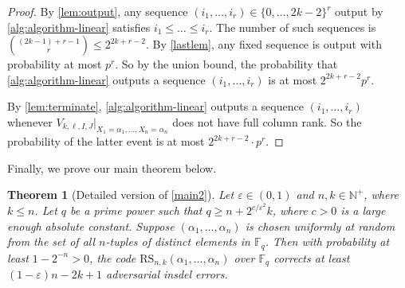 \documentclass[11pt]{article}
\theoremstyle{plain}
\newtheorem{thm}{Theorem}
\theoremstyle{definition}
\theoremstyle{remark}
\newcommand{\N}{\mathbb{N}}
\newcommand{\F}{\mathbb{F}}
\newcommand{\eps}{\varepsilon}
\renewcommand{\epsilon}{\varepsilon}
\newcommand{\Fq}{\mathbb{F}_q}
\begin{document}
\begin{proof}
By \cref{lem:output}, any sequence $(i_1,\dots,i_r)\in\{0,\dots,2k-2\}^r$ output by \cref{alg:algorithm-linear} satisfies $i_1\leq \dots\leq i_r$.
The number of such sequences is $\binom{(2k-1)+r-1}{r}\leq 2^{2k+r-2}$.
By \cref{lastlem}, any fixed sequence is output with probability at most $p^r$.
So by the union bound,
the probability that \cref{alg:algorithm-linear} outputs a sequence $(i_1,\dots,i_r)$ is at most $2^{2k+r-2} p^r$. 

By \cref{lem:terminate}, 
\cref{alg:algorithm-linear} outputs a sequence $(i_1,\dots,i_r)$ whenever $V_{k,\ell,I,J}|_{X_1=\alpha_1,\dots,X_n=\alpha_n}$ does not have full column rank. 
So the probability of the latter event is at most $2^{2k+r-2}\cdot p^r$. 
\end{proof}
Finally, we prove our main theorem below.
\begin{thm}[Detailed version of \cref{main2}]\label{main}
Let $\varepsilon\in (0,1)$ and $n,k\in\N^+$, where $k\leq n$.  
Let $q$ be a prime power such that $q\geq n+2^{c/\eps^2} k$, where $c>0$ is a large enough absolute constant.
Suppose $(\alpha_1,\dots,\alpha_n)$ is chosen uniformly at random from the set of all $n$-tuples of distinct elements in $\F_q$.
Then with probability at least $1-2^{-n}>0$, the code $\text{RS}_{n,k}(\alpha_1, \ldots, \alpha_n)$ over $\Fq$ corrects at least $(1-\epsilon)n-2k+1$ adversarial insdel errors.
\end{thm}
\end{document}
